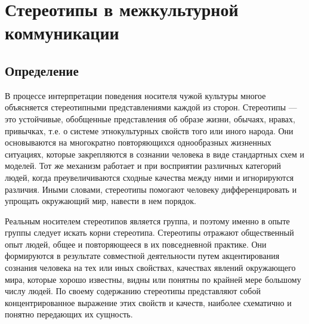 \documentclass[14pt, a4paper] {ncc}
\begin{document}
\section{Стереотипы в межкультурной коммуникации}

	\subsection{Определение}

        В процессе интерпретации поведения носителя чужой культуры многое объясняется
        стереотипными представлениями каждой из сторон. Стереотипы — это устойчивые,
        обобщенные представления об образе жизни, обычаях, нравах, привычках, т.е. о
        системе этнокультурных свойств того или иного народа. Они основываются
        на многократно повторяющихся однообразных жизненных ситуациях, которые
        закрепляются в сознании человека в виде стандартных схем и моделей. Тот
        же механизм работает и при восприятии различных категорий людей, когда
        преувеличиваются сходные качества между ними и игнорируются различия. Иными
        словами, стереотипы помогают человеку дифференцировать и упрощать окружающий
        мир, навести в нем порядок.

        Реальным носителем стереотипов является группа, и поэтому именно в опыте группы
        следует искать корни стереотипа. Стереотипы отражают общественный опыт людей,
        общее и повторяющееся в их повседневной практике. Они формируются в результате
        совместной деятельности путем акцентирования сознания человека на тех или
        иных свойствах, качествах явлений окружающего мира, которые хорошо известны,
        видны или понятны по крайней мере большому числу людей. По своему содержанию
        стереотипы представляют собой концентрированное выражение этих свойств и
        качеств, наиболее схематично и понятно передающих их сущность.\cite{Sadoh}
\end{document}

